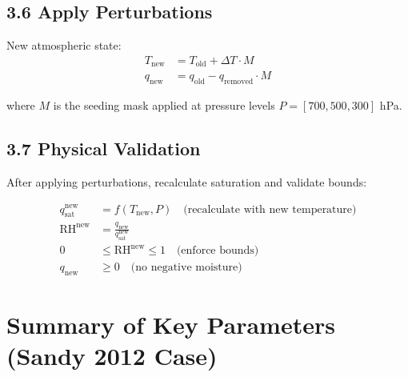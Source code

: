\documentclass{article}
\begin{document}
\subsection*{3.6 Apply Perturbations}

New atmospheric state:
\begin{equation}
\boxed{
\begin{aligned}
T_{\text{new}} &= T_{\text{old}} + \Delta T \cdot M \\
q_{\text{new}} &= q_{\text{old}} - q_{\text{removed}} \cdot M
\end{aligned}
}
\end{equation}

where $M$ is the seeding mask applied at pressure levels $P = [700, 500, 300]$ hPa.

\subsection*{3.7 Physical Validation}

After applying perturbations, recalculate saturation and validate bounds:

\begin{align}
q_{\text{sat}}^{\text{new}} &= f(T_{\text{new}}, P) \quad \text{(recalculate with new temperature)} \\
\text{RH}^{\text{new}} &= \frac{q_{\text{new}}}{q_{\text{sat}}^{\text{new}}} \\
0 &\leq \text{RH}^{\text{new}} \leq 1 \quad \text{(enforce bounds)} \\
q_{\text{new}} &\geq 0 \quad \text{(no negative moisture)}
\end{align}


\section*{Summary of Key Parameters (Sandy 2012 Case)}
\end{document}

